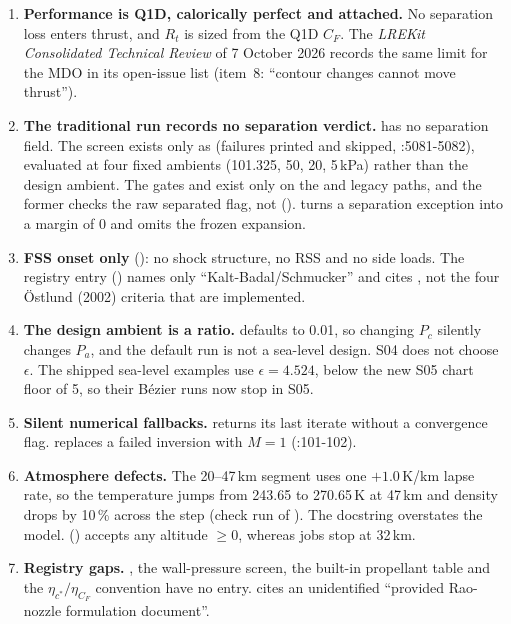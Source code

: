 \begin{enumerate}
\item \textbf{Performance is Q1D, calorically perfect and attached.} No separation loss enters thrust, and $R_t$ is sized from the Q1D $C_F$. The \emph{LREKit Consolidated Technical Review} of 7 October 2026 records the same limit for the MDO in its open-issue list (item~8: ``contour changes cannot move thrust'').
\item \textbf{The traditional run records no separation verdict.}  has no separation field. The screen exists only as  (failures printed and skipped, :5081-5082), evaluated at four fixed ambients (101.325, 50, 20, 5\,kPa) rather than the design ambient. The gates  and  exist only on the  and legacy paths, and the former checks the raw separated flag, not  ().  turns a separation exception into a margin of 0 and omits the frozen expansion.
\item \textbf{FSS onset only} (): no shock structure, no RSS and no side loads. The registry entry  () names only ``Kalt-Badal/Schmucker'' and cites , not the four Östlund (2002) criteria that are implemented.
\item \textbf{The design ambient is a ratio.}  defaults to 0.01, so changing $P_c$ silently changes $P_a$, and the default run is not a sea-level design. S04 does not choose $\epsilon$. The shipped sea-level examples use $\epsilon=4.524$, below the new S05 chart floor of 5, so their Bézier runs now stop in S05.
\item \textbf{Silent numerical fallbacks.}  returns its last iterate without a convergence flag.  replaces a failed inversion with $M=1$ (:101-102).
\item \textbf{Atmosphere defects.} The 20--47\,km segment uses one $+1.0$\,K/km lapse rate, so the temperature jumps from 243.65 to 270.65\,K at 47\,km and density drops by 10\,\% across the step (check run of ). The docstring overstates the model.  () accepts any altitude $\ge 0$, whereas jobs stop at 32\,km.
\item \textbf{Registry gaps.} , the wall-pressure screen, the built-in propellant table and the $\eta_{c^*}/\eta_{C_F}$ convention have no  entry.  cites an unidentified ``provided Rao-nozzle formulation document''.
\end{enumerate}

